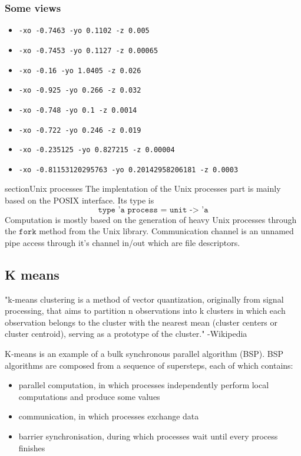 \documentclass[10pt,a4paper]{article}
\begin{document}
\subsubsection{Some views}
\begin{itemize}[label={}]
	\item \texttt{-xo -0.7463 -yo 0.1102 -z 0.005}
	\item \texttt{-xo -0.7453 -yo 0.1127 -z 0.00065}
	\item \texttt{-xo -0.16 -yo 1.0405 -z 0.026}
	\item \texttt{-xo -0.925 -yo 0.266 -z 0.032}
	\item \texttt{-xo -0.748 -yo 0.1 -z 0.0014}
	\item \texttt{-xo -0.722 -yo 0.246 -z 0.019}
	\item \texttt{-xo -0.235125 -yo 0.827215 -z 0.00004}
	\item \texttt{-xo -0.81153120295763 -yo 0.20142958206181 -z 0.0003}
\end{itemize}
section{Unix processes}
The implentation of the Unix processes part is mainly based on the POSIX interface. Its type is $$\texttt{type 'a process = unit -> 'a}$$
Computation is mostly based on the generation of heavy Unix processes through the $\texttt{fork}$ method from the Unix library.
Communication channel is an unnamed pipe access through it's channel in/out which are file descriptors.

\subsection{K means}

"k-means clustering is a method of vector quantization, originally from signal processing, that aims to partition n observations into k clusters in which each observation belongs to the cluster with the nearest mean (cluster centers or cluster centroid), serving as a prototype of the cluster." 
-Wikipedia

K-means is an example of a bulk synchronous parallel algorithm (BSP). BSP algorithms are composed from a sequence of supersteps, each of which contains:
\begin{itemize}
    \item parallel computation, in which processes independently perform local computations and produce some values
    \item communication, in which processes exchange data
    \item barrier synchronisation, during which processes wait until every process finishes

\end{itemize}
\end{document}
